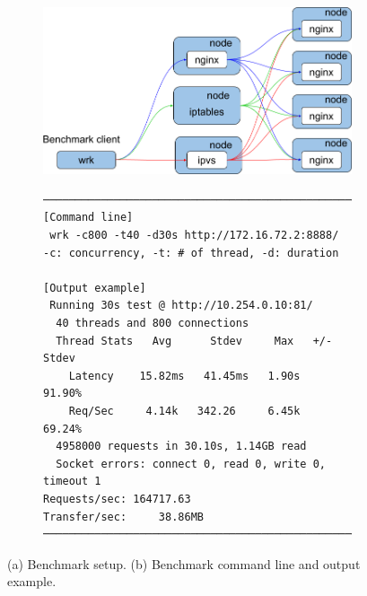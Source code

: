 \begin{figure}[tb]

  \begin{subfigure}[t]{\columnwidth}
    \includegraphics[width=0.9\columnwidth]{Figs/lb_single_schem}
    \caption{}
    \label{fig:lb_single_schem}
  \end{subfigure}

  \par\bigskip

  \begin{subfigure}[t]{\columnwidth}

\centering
\begin{Verbatim}[commandchars=\\\{\}]
───────────────────────────────────────────────────────
[Command line]
 wrk -c800 -t40 -d30s http://172.16.72.2:8888/
-c: concurrency, -t: # of thread, -d: duration

[Output example]
 Running 30s test @ http://10.254.0.10:81/
  40 threads and 800 connections
  Thread Stats   Avg      Stdev     Max   +/- Stdev
    Latency    15.82ms   41.45ms   1.90s    91.90%
    Req/Sec     4.14k   342.26     6.45k    69.24%
  4958000 requests in 30.10s, 1.14GB read
  Socket errors: connect 0, read 0, write 0, timeout 1
Requests/sec: 164717.63
Transfer/sec:     38.86MB
───────────────────────────────────────────────────────
\end{Verbatim}

    \caption{}
    \label{fig:bench_example}
  \end{subfigure}

  \caption{
    (a) Benchmark setup. (b) Benchmark command line and output example.
  }
  \label{fig:benchmark-schem}
\end{figure}


